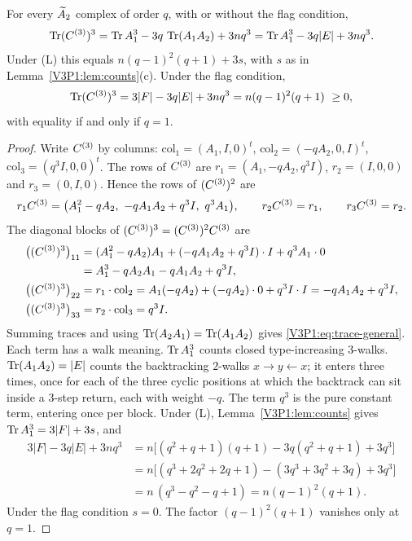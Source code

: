 \begin{theorem}\label{V3P1:thm:trace}
For every $\widetilde A_2$ complex of order $q$, with or without the flag condition,
\begin{equation}\label{V3P1:eq:trace-general}
\operatorname{Tr}(C^{(3)})^{3}=\operatorname{Tr} A_1^{3}-3q\,\operatorname{Tr}(A_1A_2)+3nq^{3}=\operatorname{Tr} A_1^{3}-3q|E|+3nq^{3}.
\end{equation}
Under \textup{(L)} this equals $n(q-1)^{2}(q+1)+3s$, with $s$ as in
Lemma~\ref{V3P1:lem:counts}(c). Under the flag condition,
\begin{equation}\label{V3P1:eq:trace-flag}
\operatorname{Tr}(C^{(3)})^{3}=3|F|-3q|E|+3nq^{3}=n(q-1)^{2}(q+1)\ \ge 0,
\end{equation}
with equality if and only if $q=1$.
\end{theorem}

\begin{proof}
Write $C^{(3)}$ by columns: $\mathrm{col}_1=(A_1,I,0)^{t}$,
$\mathrm{col}_2=(-qA_2,0,I)^{t}$, $\mathrm{col}_3=(q^{3}I,0,0)^{t}$. The rows of $C^{(3)}$ are
$r_1=(A_1,-qA_2,q^{3}I)$, $r_2=(I,0,0)$ and $r_3=(0,I,0)$. Hence the rows of $(C^{(3)})^{2}$
are
\[
r_1\Cthree=\bigl(A_1^{2}-qA_2,\ -qA_1A_2+q^{3}I,\ q^{3}A_1\bigr),\qquad
r_2\Cthree=r_1,\qquad r_3\Cthree=r_2 .
\]
The diagonal blocks of $(C^{(3)})^{3}=(C^{(3)})^{2}C^{(3)}$ are
\begin{align*}
\bigl((C^{(3)})^{3}\bigr)_{11}&=(A_1^{2}-qA_2)A_1+(-qA_1A_2+q^{3}I)\cdot I+q^{3}A_1\cdot 0\\
&=A_1^{3}-qA_2A_1-qA_1A_2+q^{3}I,\\
\bigl((C^{(3)})^{3}\bigr)_{22}&=r_1\cdot\mathrm{col}_2=A_1(-qA_2)+(-qA_2)\cdot0+q^{3}I\cdot I=-qA_1A_2+q^{3}I,\\
\bigl((C^{(3)})^{3}\bigr)_{33}&=r_2\cdot\mathrm{col}_3=q^{3}I .
\end{align*}
Summing traces and using $\operatorname{Tr}(A_2A_1)=\operatorname{Tr}(A_1A_2)$ gives \eqref{V3P1:eq:trace-general}.
Each term has a walk meaning. $\operatorname{Tr} A_1^{3}$ counts closed type-increasing $3$-walks.
$\operatorname{Tr}(A_1A_2)=|E|$ counts the backtracking $2$-walks $x\to y\leftarrow x$; it enters three
times, once for each of the three cyclic positions at which the backtrack can sit inside a
$3$-step return, each with weight $-q$. The term $q^{3}$ is the pure constant term, entering
once per block. Under (L), Lemma~\ref{V3P1:lem:counts} gives $\operatorname{Tr} A_1^{3}=3|F|+3s$, and
\begin{align*}
3|F|-3q|E|+3nq^{3}
&=n\bigl[(q^{2}+q+1)(q+1)-3q(q^{2}+q+1)+3q^{3}\bigr]\\
&=n\bigl[(q^{3}+2q^{2}+2q+1)-(3q^{3}+3q^{2}+3q)+3q^{3}\bigr]\\
&=n\,(q^{3}-q^{2}-q+1)=n(q-1)^{2}(q+1).
\end{align*}
Under the flag condition $s=0$. The factor $(q-1)^{2}(q+1)$ vanishes only at $q=1$.
\end{proof}

